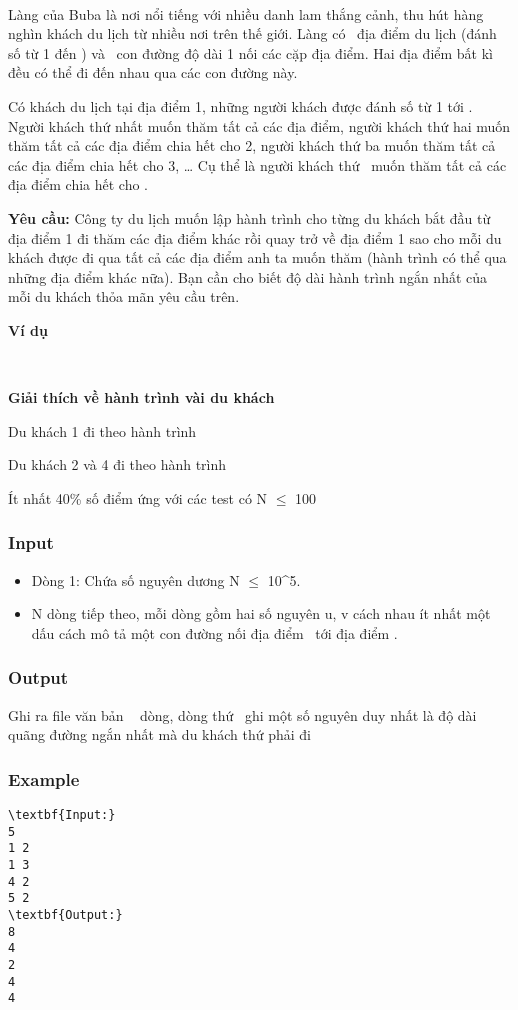 

 

Làng của Buba là nơi nổi tiếng với nhiều danh lam thắng cảnh, thu hút hàng nghìn khách du lịch từ nhiều nơi trên thế giới. Làng có  địa điểm du lịch (đánh số từ 1 đến ) và  con đường độ dài 1 nối các cặp địa điểm. Hai địa điểm bất kì đều có thể đi đến nhau qua các con đường này.

Có khách du lịch tại địa điểm 1, những người khách được đánh số từ 1 tới . Người khách thứ nhất muốn thăm tất cả các địa điểm, người khách thứ hai muốn thăm tất cả các địa điểm chia hết cho 2, người khách thứ ba muốn thăm tất cả các địa điểm chia hết cho 3, … Cụ thể là người khách thứ  muốn thăm tất cả các địa điểm chia hết cho .

\textbf{Yêu cầu: } Công ty du lịch muốn lập hành trình cho từng du khách bắt đầu từ địa điểm 1 đi thăm các địa điểm khác rồi quay trở về địa điểm 1 sao cho mỗi du khách được đi qua tất cả các địa điểm anh ta muốn thăm (hành trình có thể qua những địa điểm khác nữa). Bạn cần cho biết độ dài hành trình ngắn nhất của mỗi du khách thỏa mãn yêu cầu trên.

\textbf{Ví dụ }

 

\textbf{Giải thích về hành trình vài du khách }

Du khách 1 đi theo hành trình \textbf{}

Du khách 2 và 4 đi theo hành trình

Ít nhất 40\% số điểm ứng với các test có N  $\le$  100

\subsubsection{Input}
\begin{itemize}
	\item Dòng 1: Chứa số nguyên dương N  $\le$  10^5.
	\item N dòng tiếp theo, mỗi dòng gồm hai số nguyên u, v cách nhau ít nhất một dấu cách mô tả một con đường nối địa điểm  tới địa điểm .
\end{itemize}

\subsubsection{Output}

Ghi ra file văn bản   dòng, dòng thứ  ghi một số nguyên duy nhất là độ dài quãng đường ngắn nhất mà du khách thứ phải đi

\subsubsection{Example}
\begin{verbatim}
\textbf{Input:}
5
1 2
1 3
4 2
5 2
\textbf{Output:}
8
4
2
4
4\end{verbatim}
